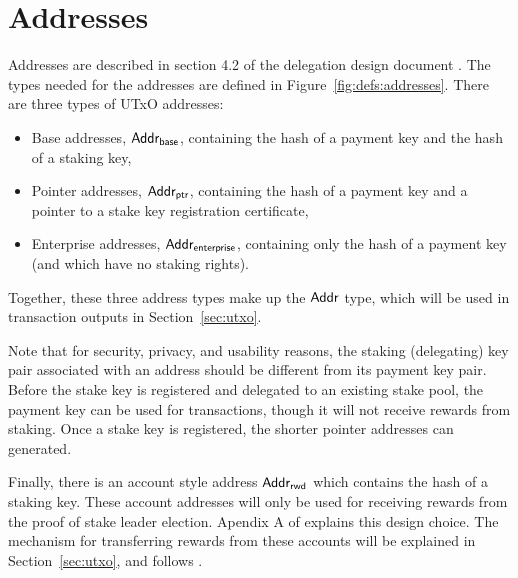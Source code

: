 \section{Addresses}
\label{sec:addresses}

Addresses are described in section 4.2 of the delegation design document \cite{delegation_design}.
The types needed for the addresses are defined in Figure~\ref{fig:defs:addresses}.
There are three types of UTxO addresses:
\begin{itemize}
  \item Base addresses, $\mathsf{Addr_{base}}$,
        containing the hash of a payment key and the hash of a staking key,
  \item Pointer addresses, $\mathsf{Addr_{ptr}}$,
        containing the hash of a payment key and a pointer to a stake key registration certificate,
  \item Enterprise addresses, $\mathsf{Addr_{enterprise}}$,
        containing only the hash of a payment key (and which have no staking rights).
\end{itemize}
Together, these three address types make up the $\mathsf{Addr}$ type, which will be used
in transaction outputs in Section~\ref{sec:utxo}.

Note that for security, privacy, and usability reasons, the staking (delegating)
key pair associated with an address should be different from its payment key pair.
Before the stake key is registered and delegated to an existing stake pool,
the payment key can be used for transactions, though it will not receive rewards from staking.
Once a stake key is registered, the shorter pointer addresses can generated.

Finally, there is an account style address $\mathsf{Addr_{rwd}}$ which contains the hash of a staking key.
These account addresses will only be used for receiving rewards from the proof of
stake leader election.  Apendix A of \cite{delegation_design} explains this design choice.
The mechanism for transferring rewards from these accounts will be explained in
Section~\ref{sec:utxo}, and follows \cite{chimeric}.

